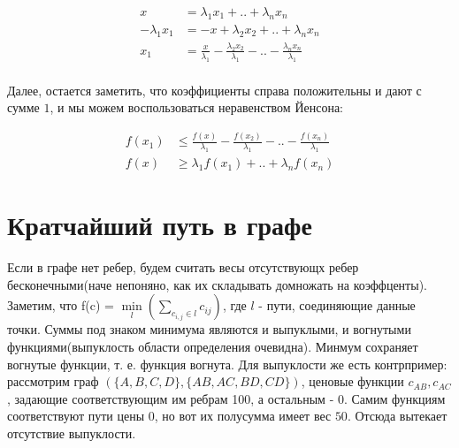 \documentclass{article}
\begin{document}
\begin{align*} 
x &= \lambda_1x_1 + .. + \lambda_nx_n \\
-\lambda_1x_1 &= -x + \lambda_2x_2 + .. + \lambda_nx_n \\
x_1 &= \frac{x}{\lambda_1} - \frac{\lambda_2 x_2}{\lambda_1} - .. - \frac{\lambda_n x_n}{\lambda_1} \\
\end{align*}

Далее, остается заметить, что коэффициенты справа положительны и дают с сумме $1$,
и мы можем воспользоваться неравенством Йенсона:

\begin{align*} 
f(x_1) &\leq \frac{f(x)}{\lambda_1} - \frac{f(x_2)}{\lambda_1} - .. - \frac{f(x_n)}{\lambda_1} \\
f(x) &\geq \lambda_1 f(x_1) + .. + \lambda_n f(x_n)
\end{align*}

\section{Кратчайший путь в графе} Если в графе нет ребер, будем считать весы отсутствующх ребер бесконечными(наче непоняно, как их складывать  домножать на коэффценты). Заметим, что f(c) = $\min\limits_{l}(\sum\limits_{c_{i, j} \in l}c_{ij})$, где $l$ - пути, соединяющие данные точки. Суммы под знаком минимума являются и выпуклыми, и вогнутыми функциями(выпуклость области определения очевидна). Минмум сохраняет вогнутые функции, т. е. функция вогнута. Для выпуклости же есть контрпример: рассмотрим граф $(\{A, B, C, D\}, \{AB, AC, BD, CD\})$, ценовые функции
$c_{AB}, c_{AC}$, задающие соответствующим им ребрам 100, а остальным - 0. Самим функциям соответствуют пути цены 0, но вот их полусумма имеет вес $50$. Отсюда вытекает отсутствие выпуклости.
\end{document}

